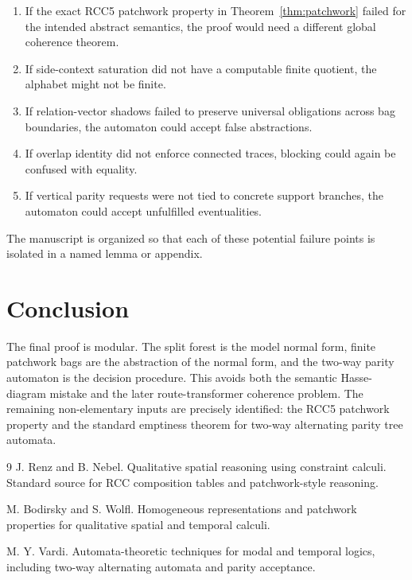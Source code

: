 \documentclass[11pt]{article}
\begin{document}
\begin{enumerate}[label=(F\arabic*)]
\item If the exact RCC5 patchwork property in Theorem~\ref{thm:patchwork} failed for the intended abstract semantics, the proof would need a different global coherence theorem.
\item If side-context saturation did not have a computable finite quotient, the alphabet might not be finite.
\item If relation-vector shadows failed to preserve universal obligations across bag boundaries, the automaton could accept false abstractions.
\item If overlap identity did not enforce connected traces, blocking could again be confused with equality.
\item If vertical parity requests were not tied to concrete support branches, the automaton could accept unfulfilled eventualities.
\end{enumerate}
The manuscript is organized so that each of these potential failure points is isolated in a named lemma or appendix.


\section{Conclusion}

The final proof is modular.  The split forest is the model normal form, finite patchwork bags are the abstraction of the normal form, and the two-way parity automaton is the decision procedure.  This avoids both the semantic Hasse-diagram mistake and the later route-transformer coherence problem.  The remaining non-elementary inputs are precisely identified: the RCC5 patchwork property and the standard emptiness theorem for two-way alternating parity tree automata.

\begin{thebibliography}{9}
J. Renz and B. Nebel. Qualitative spatial reasoning using constraint calculi.  Standard source for RCC composition tables and patchwork-style reasoning.

M. Bodirsky and S. Wolfl. Homogeneous representations and patchwork properties for qualitative spatial and temporal calculi.

M. Y. Vardi. Automata-theoretic techniques for modal and temporal logics, including two-way alternating automata and parity acceptance.
\end{thebibliography}
\end{document}
